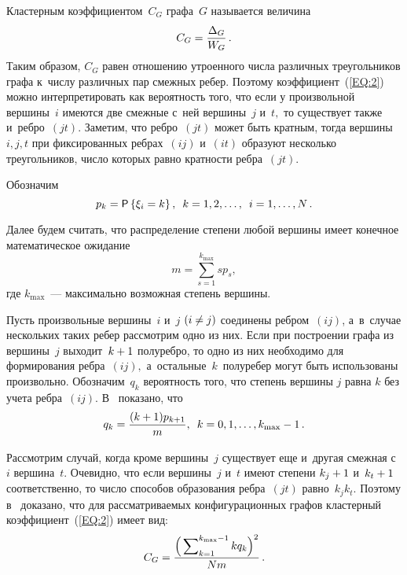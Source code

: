 \begin{multicols}{2}
Кластерным коэффициентом~$C_G$ графа~$G$ называется величина
\begin{equation}
\label{EQ:2}
C_G=\displaystyle\frac{\displaystyle \Delta_G\mathstrut}{\displaystyle W_G\mathstrut}\,.
\end{equation}
Таким образом, $C_G$ равен отношению утроенного числа различных треугольников
 графа к~числу различных пар смежных ребер. Поэтому коэффициент~(\ref{EQ:2})
можно интерпретировать как вероятность того, что если у произвольной вершины~$i$ 
имеются две смежные с~ней вершины~$j$ и~$t,$ то существует также и~реб\-ро~$(jt).$
Заметим, что реб\-ро~$(jt)$ может быть кратным, тогда вершины~$i,j,t$ 
при фиксированных ребрах~$(ij)$ и~$(it)$ образуют несколько треугольников, число
которых равно кратности ребра~$(jt).$

Обозначим
\begin{equation}
\label{EQ:3}
p_k={\sf P}\left\{\xi_i = k\right\}, \enskip k=1,2,\ldots, \enskip i=1,\ldots, N\,.
\end{equation}

Далее будем считать, что распределение степени любой вершины имеет 
конечное математическое ожидание
\begin{equation}
\label{EQ:4}
m=\sum\limits_{s=1}^{k_{\max}} sp_s,
\end{equation}
где $k_{\max}$~--- максимально возможная степень вершины.

Пусть произвольные вершины~$i$ и~$j$ $(i\hm\neq j)$ соединены ребром~$(ij)$, 
а~в~случае нескольких таких ребер рассмотрим одно из них.
Если при построении графа из вершины~$j$ выходит~$k\hm+1$ полуребро, 
то одно из них необходимо для формирования ребра~$(ij),$ а~остальные~$k$~полуребер
могут быть использованы произвольно. Обозначим~$q_k$ вероятность того, что 
степень вершины $j$ равна $k$ без учета ребра~$(ij).$ В~\cite{New} показано,
что
\begin{equation}
\label{EQ:5}
q_k=\displaystyle\frac{\displaystyle (k+1)p_{k+1}\mathstrut}{\displaystyle m\mathstrut}, \enskip k=0,1,\ldots,k_{\max} -1\,.
\end{equation}

Рассмотрим случай, когда кроме вершины~$j$ существует еще и~другая смежная с~$i$ 
вершина~$t.$ Очевидно, что если вершины~$j$ и~$t$ имеют степени $k_j\hm+1$ и~$k_t\hm+1$ 
соответственно, то число способов образования ребра~$(jt)$ равно~$k_jk_t.$ 
Поэтому в~\cite{New} доказано, что для рассматриваемых конфигурационных графов 
кластерный коэффициент~(\ref{EQ:2}) имеет вид:
\begin{equation}
\label{EQ:6}
C_G=\displaystyle\frac{\displaystyle \Big(\sum\nolimits_{k=1}^{k_{\max}-1} kq_k\Big)^2\mathstrut}{\displaystyle Nm\mathstrut}\,.
\end{equation}


\end{multicols}
